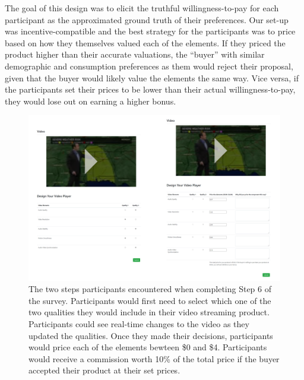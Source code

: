 The goal of this design was to elicit the truthful willingness-to-pay for each participant as the approximated ground truth of their preferences. Our set-up was incentive-compatible and the best strategy for the participants was to price based on how they themselves valued each of the elements. If they priced the product higher than their accurate valuations, the ``buyer'' with similar demographic and consumption preferences as them would reject their proposal, given that the buyer would likely value the elements the same way. Vice versa, if the participants set their prices to be lower than their actual willingness-to-pay, they would lose out on earning a higher bonus.

\begin{figure}[htpb]
    \centering
    \includegraphics[width=\textwidth, keepaspectratio=true]{content/image/design_task.png}
    \caption{
        The two steps participants encountered when completing Step 6 of the survey. Participants would first need to select which one of the two qualities they would include in their video streaming product. Participants could see real-time changes to the video as they updated the qualities. Once they made their decisions, participants would price each of the elements bewteen \$0 and \$4. Participants would receive a commission worth 10\% of the total price if the buyer accepted their product at their set prices.
    }
    \label{fig:exp2_store}
\end{figure}


